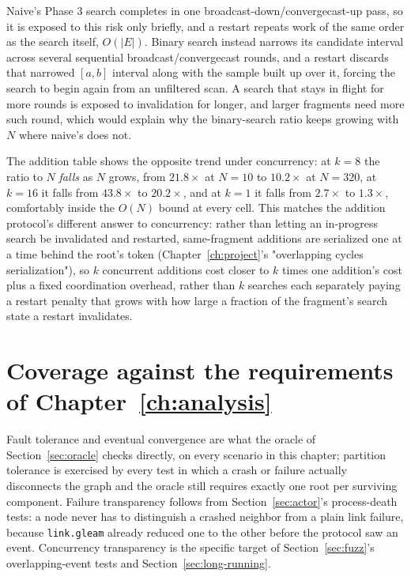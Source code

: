 Naive's Phase 3 search completes in one broadcast-down/convergecast-up pass, so it is
exposed to this risk only briefly, and a restart repeats work of the same order as the
search itself, $O(|E|)$. Binary search instead narrows its candidate interval across
several sequential broadcast/convergecast rounds, and a restart
discards that narrowed $[a,b]$ interval along with the sample built up over it, forcing the
search to begin again from an unfiltered scan. A search that stays in flight for more
rounds is exposed to invalidation for longer, and larger fragments need more such round,
which would explain why the binary-search ratio keeps growing with $N$ where naive's does
not.

The addition table shows the opposite trend under concurrency: at $k=8$ the ratio to $N$
\emph{falls} as $N$ grows, from $21.8\times$ at $N=10$ to $10.2\times$ at $N=320$, at
$k=16$ it falls from $43.8\times$ to $20.2\times$, and at $k=1$ it falls from $2.7\times$ to
$1.3\times$, comfortably inside the $O(N)$ bound at every cell. This matches the addition
protocol's different answer to concurrency: rather than letting an in-progress search be
invalidated and restarted, same-fragment additions are serialized one at a time behind the
root's  token (Chapter~\ref{ch:project}'s "overlapping cycles
serialization"), so $k$ concurrent additions cost closer to $k$ times one addition's cost
plus a fixed coordination overhead, rather than $k$ searches each separately paying a
restart penalty that grows with how large a fraction of the fragment's search state a
restart invalidates.

\section{Coverage against the requirements of Chapter~\ref{ch:analysis}}

Fault tolerance and eventual convergence are what the oracle of Section~\ref{sec:oracle}
checks directly, on every scenario in this chapter; partition tolerance is exercised by
every test in which a crash or failure actually disconnects the graph and the oracle still
requires exactly one root per surviving component. Failure transparency follows from
Section~\ref{sec:actor}'s process-death tests: a node never has to distinguish a crashed
neighbor from a plain link failure, because \texttt{link.gleam} already reduced one to the
other before the protocol saw an event. Concurrency transparency is the specific target of
Section~\ref{sec:fuzz}'s overlapping-event tests and Section~\ref{sec:long-running}.
